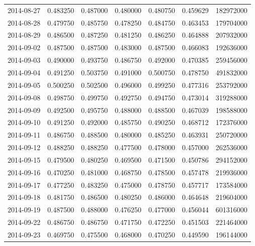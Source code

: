 \begin{tabular}{lrrrrrr}
2014-08-27 &    0.483250 &    0.487000 &    0.480000 &    0.480750 &    0.459629 &   182972000 \\
2014-08-28 &    0.479750 &    0.485750 &    0.478250 &    0.484750 &    0.463453 &   179704000 \\
2014-08-29 &    0.486500 &    0.487250 &    0.481250 &    0.486250 &    0.464888 &   207932000 \\
2014-09-02 &    0.487500 &    0.487500 &    0.483000 &    0.487500 &    0.466083 &   192636000 \\
2014-09-03 &    0.490000 &    0.493750 &    0.486750 &    0.492000 &    0.470385 &   259456000 \\
2014-09-04 &    0.491250 &    0.503750 &    0.491000 &    0.500750 &    0.478750 &   491832000 \\
2014-09-05 &    0.500250 &    0.502500 &    0.496000 &    0.499250 &    0.477316 &   253792000 \\
2014-09-08 &    0.498750 &    0.499750 &    0.492750 &    0.494750 &    0.473014 &   319288000 \\
2014-09-09 &    0.492500 &    0.495750 &    0.488000 &    0.488500 &    0.467039 &   198588000 \\
2014-09-10 &    0.491250 &    0.492000 &    0.485750 &    0.490250 &    0.468712 &   172376000 \\
2014-09-11 &    0.486750 &    0.488500 &    0.480000 &    0.485250 &    0.463931 &   250720000 \\
2014-09-12 &    0.488250 &    0.488250 &    0.477500 &    0.478000 &    0.457000 &   262536000 \\
2014-09-15 &    0.479500 &    0.480250 &    0.469500 &    0.471500 &    0.450786 &   294152000 \\
2014-09-16 &    0.470250 &    0.481000 &    0.468750 &    0.478500 &    0.457478 &   219936000 \\
2014-09-17 &    0.477250 &    0.483250 &    0.475000 &    0.478750 &    0.457717 &   173584000 \\
2014-09-18 &    0.481750 &    0.486500 &    0.480250 &    0.486000 &    0.464648 &   219604000 \\
2014-09-19 &    0.487500 &    0.488000 &    0.476250 &    0.477000 &    0.456044 &   601316000 \\
2014-09-22 &    0.486750 &    0.486750 &    0.471750 &    0.472250 &    0.451503 &   221464000 \\
2014-09-23 &    0.469750 &    0.475500 &    0.468000 &    0.470250 &    0.449590 &   196144000 \\

\end{tabular}
